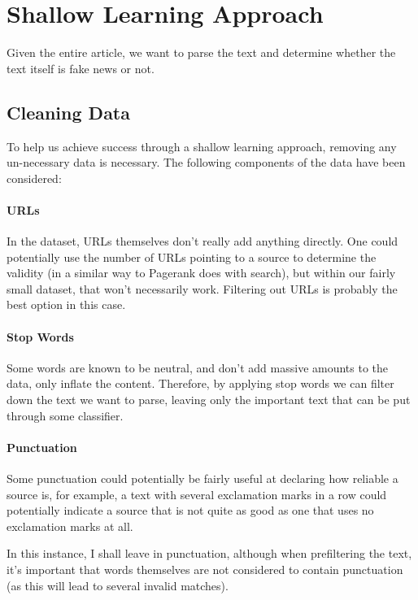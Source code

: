 \documentclass[12pt]{article}
\begin{document}
\maketitle

\section{Shallow Learning Approach}
Given the entire article, we want to parse the text and determine whether the text itself is fake news or not.
\subsection{Cleaning Data}
To help us achieve success through a shallow learning approach, removing any un-necessary data is necessary.
The following components of the data have been considered:

\paragraph{URLs}
In the dataset, URLs themselves don't really add anything directly. One could potentially use the number of URLs pointing to a source
to determine the validity (in a similar way to Pagerank does with search), but within our fairly small dataset, that won't necessarily work. 
Filtering out URLs is probably the best option in this case.

\paragraph{Stop Words}
Some words are known to be neutral, and don't add massive amounts to the data, only inflate the content. Therefore, by
applying stop words we can filter down the text we want to parse, leaving only the important text that can be put through
some classifier.

\paragraph{Punctuation}
Some punctuation could potentially be fairly useful at declaring how reliable a source is,
for example, a text with several exclamation marks in a row could potentially indicate a source that
is not quite as good as one that uses no exclamation marks at all. 

In this instance, I shall leave in punctuation, although when prefiltering the text, it's important that words themselves are
not considered to contain punctuation (as this will lead to several invalid matches).
\end{document}

